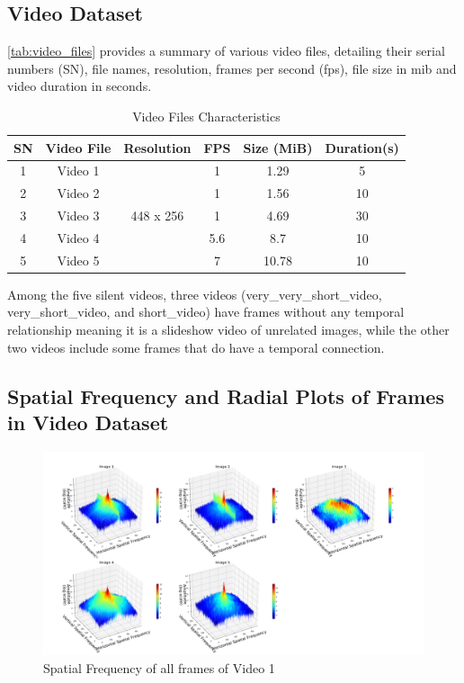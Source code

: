 \documentclass{ioereport}
\begin{document}
\subsection{Video Dataset}

\autoref{tab:video_files} provides a summary of various video files, detailing their serial numbers (SN), file names, resolution, frames per second (fps), file size in \gls{mib} and video duration in seconds.

\begin{table}[H]
    \centering
    \caption{Video Files Characteristics}
    \label{tab:video_files}
    \begin{tabular}{|c|c|c|c|c|c|}
        \hline
        \textbf{SN} & \textbf{Video File} & \textbf{Resolution} & \textbf{FPS} & \textbf{Size (MiB)} & \textbf{Duration(s)}\\ 
        \hline 
        1 & Video 1 & \multirow{5}{*}{448 x 256} & 1 & 1.29 & 5\\ 
        \cline{2-2} \cline{4-6}
        2 & Video 2 & & 1 & 1.56 & 10\\ 
        \cline{2-2} \cline{4-6}
        3 & Video 3 & & 1 & 4.69 & 30 \\ 
        \cline{2-2} \cline{4-6}
        4 & Video 4 & & 5.6 & 8.7 & 10\\ 
        \cline{2-2} \cline{4-6}
        5 & Video 5 & & 7 & 10.78 & 10\\ 
        \hline
    \end{tabular}
    \end{table}

Among the five silent videos, three videos (very\_very\_short\_video, very\_short\_video, and short\_video) have frames without any temporal relationship meaning it is a slideshow video of unrelated images, while the other two videos include some frames that do have a temporal connection.


\subsection{Spatial Frequency and Radial Plots of Frames in Video Dataset}
\begin{figure}[H]
    \centering
    \includegraphics[width=\linewidth]{assets/spatial_frequency/video1spatialfreq.png}
    \caption{Spatial Frequency of all frames of Video 1}
    \label{fig:spatial-frequency-1}
\end{figure}
\end{document}
